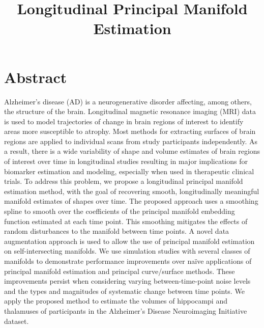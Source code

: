 \documentclass[11pt,reqno]{article}
\theoremstyle{definition}
\begin{document}
\title{Longitudinal Principal Manifold Estimation}
\author{ }



\maketitle

\doublespacing

\section*{Abstract}

Alzheimer's disease (AD) is a neurogenerative disorder affecting, among others, the structure of the brain. Longitudinal magnetic resonance imaging (MRI) data is used to model trajectories of change in brain regions of interest to identify areas more susceptible to atrophy. Most methods for extracting surfaces of brain regions are applied to individual scans from study participants independently. As a result, there is a wide variability of shape and volume estimates of brain regions of interest over time in longitudinal studies resulting in major implications for biomarker estimation and modeling, especially when used in therapeutic clinical trials. To address this problem, we propose a longitudinal principal manifold estimation method, with the goal of recovering smooth, longitudinally meaningful manifold estimates of shapes over time. The proposed approach uses a smoothing spline to smooth over the coefficients of the principal manifold embedding function estimated at each time point. This smoothing mitigates the effects of random disturbances to the manifold between time points. A novel data augmentation approach is used to allow the use of principal manifold estimation on self-intersecting manifolds. We use simulation studies with several classes of manifolds to demonstrate performance improvements over naïve applications of principal manifold estimation and principal curve/surface methods. These improvements persist when considering varying between-time-point noise levels and the types and magnitudes of systematic change between time points. We apply the proposed method to estimate the volumes of hippocampi and thalamuses of participants in the Alzheimer's Disease Neuroimaging Initiative dataset.
\end{document}
